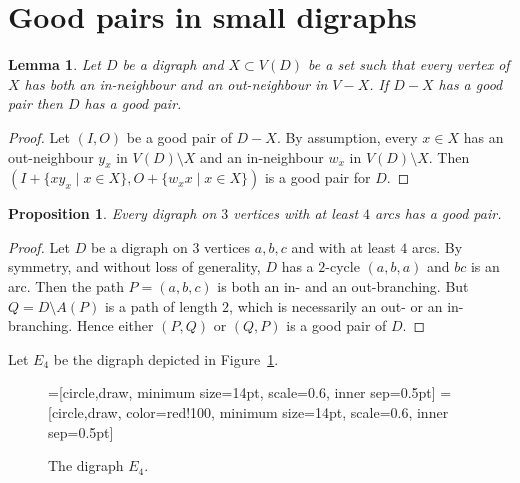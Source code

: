\documentclass{article}
\newtheorem{lemma}[theorem]{Lemma}
\newtheorem{proposition}[theorem]{Proposition}
\theoremstyle{definition}
\newcommand{\2}{\vspace{0.2cm}}
\begin{document}
\section{Good pairs in small digraphs}


\begin{lemma} \label{extend}
Let $D$ be a digraph and $X \subset V(D)$ be a set such that every
vertex of $X$ has both an in-neighbour and an out-neighbour in $V-X$.
If $D-X$ has a good pair then $D$ has a good pair.
\end{lemma}

\begin{proof}
Let $(I,O)$ be a good pair of $D-X$.  By assumption, every $x\in X$
has an out-neighbour $y_x$ in $V(D)\setminus X$ and an in-neighbour
$w_x$ in $V(D)\setminus X$.  Then $(I+\{xy_x \mid x\in X\}, O+ \{w_xx
\mid x\in X\})$ is a good pair for $D$.
\end{proof}


\begin{proposition}\label{prop:n=3}
Every digraph on $3$ vertices with at least $4$ arcs has a good pair.
\end{proposition}
\begin{proof}
Let $D$ be a digraph on $3$ vertices $a,b,c$ and with at least $4$
arcs.  By symmetry, and without loss of generality, $D$ has a
$2$-cycle $(a,b,a)$ and $bc$ is an arc.  Then the path $P=(a,b,c)$ is both
an in- and an out-branching.  But $Q=D\setminus A(P)$ is a path of
length $2$, which is necessarily an out- or an in-branching.  Hence
either $(P,Q)$ or $(Q,P)$ is a good pair of $D$.
\end{proof}




Let $E_4$ be the digraph depicted in Figure~\ref{fig:E4}.
\begin{figure}[H]
\begin{center}
=[circle,draw, minimum size=14pt, scale=0.6, inner sep=0.5pt]
=[circle,draw, color=red!100, minimum size=14pt, scale=0.6, inner sep=0.5pt]

\caption{The digraph $E_4$.}\label{fig:E4}
\end{center}
\end{figure}
\end{document}
